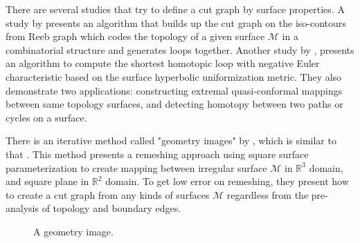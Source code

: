 \documentclass[a4paper,twoside]{article}
\begin{document}
There are several studies that try to define a cut graph by surface properties. A study by \cite{Patane:2007:FCB:1224804.1224947} presents an algorithm that builds up the cut graph on the iso-contours from Reeb graph which codes the topology of a given surface $\mathscr{M}$ in a combinatorial structure and generates loops together. Another study by \cite{Jin:2013:CSH:2396897.2396971}, presents an algorithm to compute the shortest homotopic loop with negative Euler characteristic based on the surface hyperbolic uniformization metric. They also demonstrate two applications: constructing extremal quasi-conformal mappings between same topology surfaces, and detecting homotopy between two paths or cycles on a surface. 

There is an iterative method called "geometry images" by \cite{Gu:2002:GI:566654.566589}, which is similar to that \cite{Dey:1994:NTC:177424.178001}. This method presents a remeshing approach using square surface parameterization to create mapping between irregular surface $\mathscr{M}$ in $\mathbb{R}^3$ domain, and square plane in $\mathbb{R}^2$ domain. To get low error on remeshing, they present how to create a cut graph from any kinds of surfaces $\mathscr{M}$ regardless from the pre-analysis of topology and boundary edges.

\begin{figure}[!h]
	\centering
	\hspace{10pt}
	
	\caption{A geometry image.}
	\label{fig:gim figure}
\end{figure}
\end{document}

